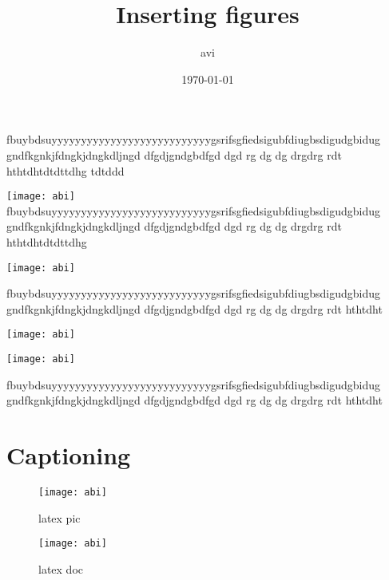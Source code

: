 \documentclass[12pt]{report}
\title{Inserting figures}
\author{avi}
\date{\today}
\begin{document}
\maketitle

\tableofcontents
\listoffigures
\pagebreak
fbuybdsuyyyyyyyyyyyyyyyyyyyyyyyyyyygsrifsgfiedsigubfdiugbsdigudgbidug
gndfkgnkjfdngkjdngkdljngd
dfgdjgndgbdfgd
dgd
rg
dg
dg
drgdrg
rdt
hthtdhtdtdttdhg
tdtddd
\vspace{1cm}

\texttt{[image: abi]}\\

fbuybdsuyyyyyyyyyyyyyyyyyyyyyyyyyyygsrifsgfiedsigubfdiugbsdigudgbidug
gndfkgnkjfdngkjdngkdljngd
dfgdjgndgbdfgd
dgd
rg
dg
dg
drgdrg
rdt
hthtdhtdtdttdhg

\vspace{1cm}

\centering
\texttt{[image: abi]}

fbuybdsuyyyyyyyyyyyyyyyyyyyyyyyyyyygsrifsgfiedsigubfdiugbsdigudgbidug
gndfkgnkjfdngkjdngkdljngd
dfgdjgndgbdfgd
dgd
rg
dg
dg
drgdrg
rdt
hthtdht

\vspace{1cm}

\centering
\texttt{[image: abi]}

\begin{center}
\texttt{[image: abi]}
\end{center}

fbuybdsuyyyyyyyyyyyyyyyyyyyyyyyyyyygsrifsgfiedsigubfdiugbsdigudgbidug
gndfkgnkjfdngkjdngkdljngd
dfgdjgndgbdfgd
dgd
rg
dg
dg
drgdrg
rdt
hthtdht

\section{Captioning}
\begin{figure}[H]
\centering
\texttt{[image: abi]}
\caption{latex pic}
\end{figure}


\begin{wrapfigure}{r}{0.25\textwidth}
\texttt{[image: abi]}
\caption{latex doc}
\end{wrapfigure}
\end{document}
